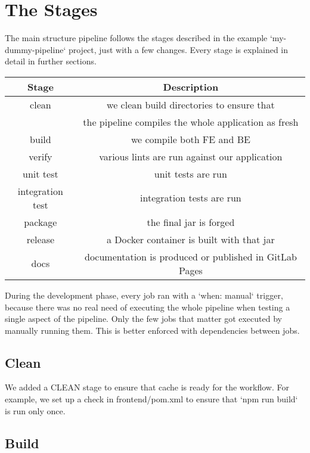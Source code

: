 \documentclass[a4paper,10pt]{scrartcl}
\begin{document}
\section{The Stages}

The main structure pipeline follows the stages described in the example `my-dummy-pipeline` project, just with a few changes. Every stage is explained in detail in further sections.

\begin{center}
    \begin{tabular}{|c|c|}
        \hline
        Stage & Description \\
        \hline
        clean & we clean build directories to ensure that \\
        & the pipeline compiles the whole application as fresh \\
        \hline
        build & we compile both FE and BE \\
        \hline
        verify & various lints are run against our application \\
        \hline
        unit test & unit tests are run \\
        \hline
        integration test & integration tests are run \\
        \hline
        package & the final jar is forged \\
        \hline
        release & a Docker container is built with that jar \\
        \hline
        docs & documentation is produced or published in GitLab Pages \\
        \hline
    \end{tabular}
\end{center}

During the development phase, every job ran with a `when: manual` trigger, because there was no real need of executing the whole pipeline when testing a single aspect of the pipeline. Only the few jobs that matter got executed by manually running them. This is better enforced with dependencies between jobs.

\subsection{Clean}

We added a CLEAN stage to ensure that cache is ready for the workflow. For example, we set up a check in frontend/pom.xml to ensure that `npm run build` is run only once.

\subsection{Build}
\end{document}
